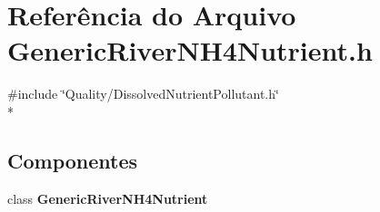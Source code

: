 \section{Referência do Arquivo Generic\+River\+N\+H4\+Nutrient.\+h}
\label{_generic_river_n_h4_nutrient_8h}
{\ttfamily \#include \char`\"{}Quality/\+Dissolved\+Nutrient\+Pollutant.\+h\char`\"{}}\\*
\subsection*{Componentes}
\begin{DoxyCompactItemize}
\item 
class {\bf Generic\+River\+N\+H4\+Nutrient}
\end{DoxyCompactItemize}
